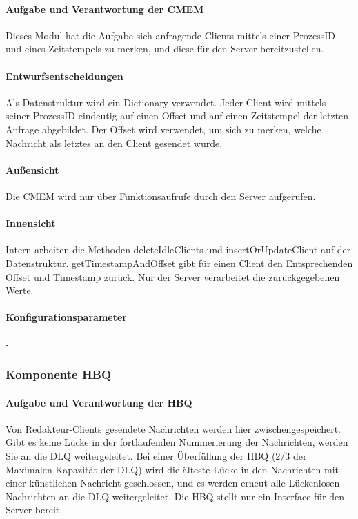 \documentclass{article}
\begin{document}
			\paragraph{Aufgabe und Verantwortung der CMEM}
				Dieses Modul hat die Aufgabe sich anfragende Clients mittels einer ProzessID und eines Zeitstempels zu merken, und diese für den Server bereitzustellen.
			\paragraph{Entwurfsentscheidungen}
				Als Datenstruktur wird ein Dictionary verwendet. Jeder Client wird mittels
				seiner ProzessID eindeutig auf einen Offset und auf einen Zeitstempel der 
				letzten Anfrage abgebildet. Der Offset wird verwendet, um sich zu merken, 
				welche Nachricht als letztes an den Client gesendet wurde.
			\paragraph{Außensicht}
				Die CMEM wird nur über Funktionsaufrufe durch den Server aufgerufen.
			\paragraph{Innensicht}
				Intern arbeiten die Methoden deleteIdleClients und insertOrUpdateClient
				auf der Datenstruktur. getTimestampAndOffset gibt für einen Client den Entsprechenden
				Offset und Timestamp zurück. Nur der Server verarbeitet die zurückgegebenen Werte.
			\paragraph{Konfigurationsparameter}
				-
			
			
		\subsubsection{Komponente HBQ}
			\paragraph{Aufgabe und Verantwortung der HBQ}
				Von Redakteur-Clients gesendete Nachrichten werden hier zwischengespeichert. Gibt es keine Lücke in der fortlaufenden Nummerierung der Nachrichten, werden Sie an die DLQ weitergeleitet. Bei einer Überfüllung der HBQ (2/3 der Maximalen Kapazität der DLQ) wird die älteste Lücke in den Nachrichten mit einer künstlichen Nachricht geschlossen, und es werden erneut alle Lückenlosen Nachrichten an die DLQ weitergeleitet. Die HBQ stellt nur ein Interface für den Server bereit.
\end{document}
